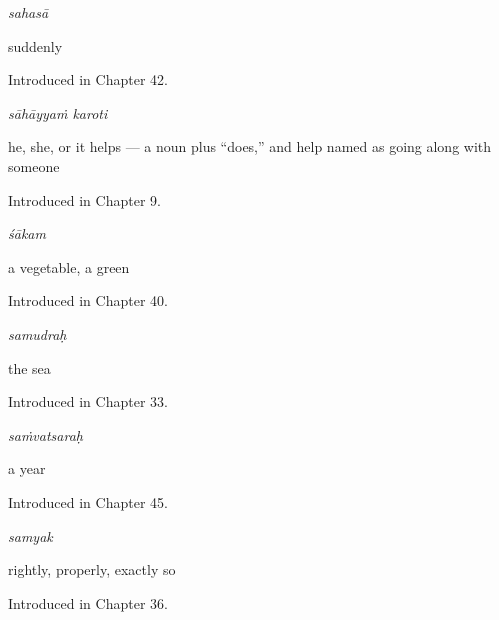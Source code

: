 \noindent\begin{minipage}[t]{\linewidth}
\raggedright
\textbf{}\enspace\emph{sahasā}\par
\small suddenly\par
\footnotesize Introduced in Chapter 42.
\end{minipage}\par\medskip

\noindent\begin{minipage}[t]{\linewidth}
\raggedright
\textbf{ }\enspace\emph{sāhāyyaṁ karoti}\par
\small he, she, or it helps — a noun plus \textquotedblleft{}does,\textquotedblright{} and help named as going along with someone\par
\footnotesize Introduced in Chapter 9.
\end{minipage}\par\medskip

\noindent\begin{minipage}[t]{\linewidth}
\raggedright
\textbf{}\enspace\emph{śākam}\par
\small a vegetable, a green\par
\footnotesize Introduced in Chapter 40.
\end{minipage}\par\medskip

\noindent\begin{minipage}[t]{\linewidth}
\raggedright
\textbf{}\enspace\emph{samudraḥ}\par
\small the sea\par
\footnotesize Introduced in Chapter 33.
\end{minipage}\par\medskip

\noindent\begin{minipage}[t]{\linewidth}
\raggedright
\textbf{}\enspace\emph{saṁvatsaraḥ}\par
\small a year\par
\footnotesize Introduced in Chapter 45.
\end{minipage}\par\medskip

\noindent\begin{minipage}[t]{\linewidth}
\raggedright
\textbf{}\enspace\emph{samyak}\par
\small rightly, properly, exactly so\par
\footnotesize Introduced in Chapter 36.
\end{minipage}\par\medskip

